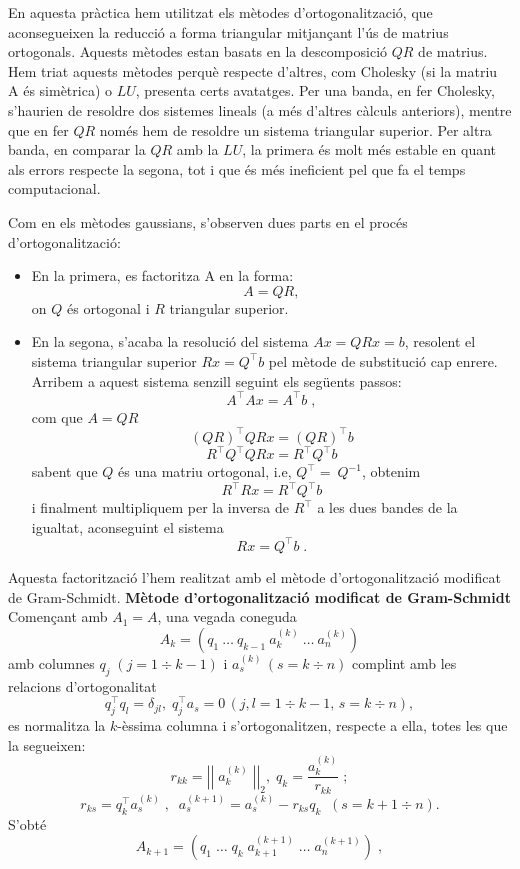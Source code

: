 \documentclass{article}
\begin{document}
En aquesta pràctica hem utilitzat els mètodes d'ortogonalització, que aconsegueixen la reducció a forma triangular mitjançant l'ús de matrius ortogonals. Aquests mètodes estan basats en la descomposició $QR$ de matrius. Hem triat aquests mètodes perquè respecte d'altres, com Cholesky (si la matriu A és simètrica) o $LU$, presenta certs avatatges. Per una banda, en fer Cholesky, s'haurien de resoldre dos sistemes lineals (a més d'altres càlculs anteriors), mentre que en fer $QR$ només hem de resoldre un sistema triangular superior. Per altra banda, en comparar la $QR$ amb la $LU$, la primera és molt més estable en quant als errors respecte la segona, tot i que és més ineficient pel que fa el temps computacional.

Com en els mètodes gaussians, s'observen dues parts en el procés d'ortogonalització:

\begin{itemize}
  \item En la primera, es factoritza A en la forma:
  $$ A =  QR, $$
  on $Q$ és ortogonal i $R$ triangular superior.
  \item En la segona, s'acaba la resolució del sistema $Ax = QRx = b$, resolent el sistema triangular superior $Rx = Q^\top b$ pel mètode de substitució cap enrere. Arribem a aquest sistema senzill seguint els següents passos: 
  $$A^\top Ax = A^\top b \;,$$
  com que $A = QR$
  $$\left(QR \right)^\top QRx = \left(QR \right)^\top b$$
  $$R^\top Q^\top  QRx = R^\top Q^\top  b$$
  sabent que $Q$ és una matriu ortogonal, i.e, $Q^\top =\ Q^{-1}$, obtenim
  $$R^\top Rx = R^\top Q^\top  b$$
  i finalment multipliquem per la inversa de $R^\top$ a les dues bandes de la igualtat, aconseguint el sistema
  $$Rx = Q^\top b \; .$$
\end{itemize}
Aquesta factorització l'hem realitzat amb el mètode d'ortogonalització mo\-di\-fi\-cat de Gram-Schmidt.\newline
\newline
\textbf{Mètode d'ortogonalització modificat de Gram-Schmidt}\newline
\newline
Començant amb $A_{1} = A$, una vegada coneguda
$$A_{k} = \left(q_{1}\: \ldots{}\: q_{k-1}\: a_{k}^{(k)}\: \ldots{} \:a_{n}^{(k)} \right)$$
amb columnes $q_{j}\;\left(j = 1 \div k - 1  \right)$ i $a_{s}^{(k)}\, \left(s = k \div n \right)$ complint amb les relacions d'ortogonalitat
$$q_{j}^\top q_{l} = \delta_{jl},\; q_{j}^\top a_{s} = 0\, \left(j, l = 1 \div k-1,\, s = k \div n \right),$$
es normalitza la $k$-èssima columna i s'ortogonalitzen, respecte a ella, totes les que la segueixen:
$$r_{kk} = \left| \left|\; a_{k}^{(k)}\; \right| \right|_{2}, \; q_{k} = \frac{a_{k}^{(k)}}{r_{kk}}\;; $$ 
$$r_{ks} = q_{k}^\top a_{s}^{(k)}\; , \; \; a_{s}^{(k+1)} = a_{s}^{(k)} - r_{ks}q_{k} \; \; \left( s = k+1 \div n \right) .$$
S'obté
$$A_{k+1} = \left( q_{1} \; \ldots{} \; q_{k} \; a_{k+1}^{(k+1)} \; \ldots{} \; a_{n}^{(k+1)} \right) \; ,$$
\end{document}
